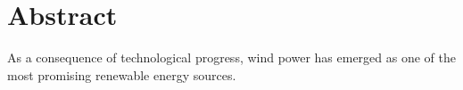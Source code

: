 \chapter*{Abstract}
As a consequence of technological progress, wind power has emerged as one of the most promising renewable energy sources.
